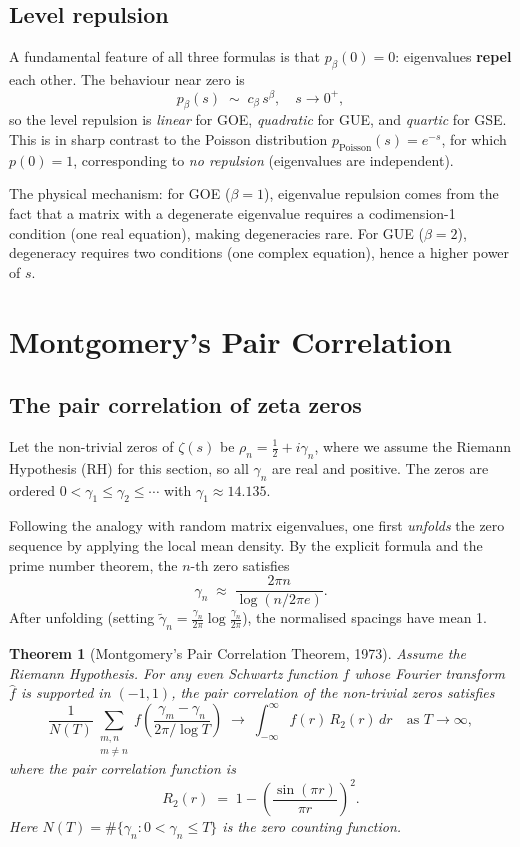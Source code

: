 \documentclass[12pt,a4paper]{amsart}
\newtheorem{theorem}{Theorem}[section]
\theoremstyle{definition}
\theoremstyle{remark}
\begin{document}
\subsection{Level repulsion}

A fundamental feature of all three formulas is that $p_\beta(0) = 0$:
eigenvalues \textbf{repel} each other. The behaviour near zero is
\[
  p_\beta(s) \;\sim\; c_\beta\, s^\beta, \quad s \to 0^+,
\]
so the level repulsion is \emph{linear} for GOE, \emph{quadratic} for GUE,
and \emph{quartic} for GSE. This is in sharp contrast to the Poisson
distribution $p_{\mathrm{Poisson}}(s) = e^{-s}$, for which $p(0) = 1$,
corresponding to \emph{no repulsion} (eigenvalues are independent).

The physical mechanism: for GOE ($\beta=1$), eigenvalue repulsion comes from
the fact that a matrix with a degenerate eigenvalue requires a codimension-1
condition (one real equation), making degeneracies rare. For GUE ($\beta=2$),
degeneracy requires two conditions (one complex equation), hence a higher
power of $s$.

\section{Montgomery's Pair Correlation}
\label{sec:montgomery}

\subsection{The pair correlation of zeta zeros}

Let the non-trivial zeros of $\zeta(s)$ be $\rho_n = \frac{1}{2} + i\gamma_n$,
where we assume the Riemann Hypothesis (RH) for this section, so all $\gamma_n$
are real and positive. The zeros are ordered $0 < \gamma_1 \leq \gamma_2 \leq \cdots$
with $\gamma_1 \approx 14.135$.

Following the analogy with random matrix eigenvalues, one first \emph{unfolds}
the zero sequence by applying the local mean density. By the explicit formula
and the prime number theorem, the $n$-th zero satisfies
\[
  \gamma_n \;\approx\; \frac{2\pi n}{\log(n/2\pi e)}.
\]
After unfolding (setting $\tilde{\gamma}_n = \frac{\gamma_n}{2\pi}\log\frac{\gamma_n}{2\pi}$),
the normalised spacings have mean 1.

\begin{theorem}[Montgomery's Pair Correlation Theorem, 1973]
\label{thm:montgomery}
Assume the Riemann Hypothesis. For any even Schwartz function $f$ whose
Fourier transform $\hat{f}$ is supported in $(-1,1)$, the pair correlation
of the non-trivial zeros satisfies
\[
  \frac{1}{N(T)}\sum_{\substack{m,n \\ m \neq n}} f\!\left(\frac{\gamma_m - \gamma_n}{2\pi/\log T}\right)
  \;\longrightarrow\;
  \int_{-\infty}^\infty f(r)\,R_2(r)\,dr \quad \text{as } T \to \infty,
\]
where the pair correlation function is
\[
  R_2(r) \;=\; 1 - \left(\frac{\sin(\pi r)}{\pi r}\right)^2.
\]
Here $N(T) = \#\{\gamma_n : 0 < \gamma_n \leq T\}$ is the zero counting function.
\end{theorem}
\end{document}

